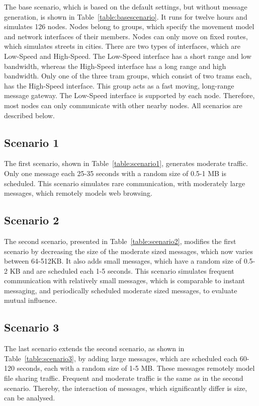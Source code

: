 \documentclass[conference,10pt,letterpaper,final]{IEEEtran}
\begin{document}
The base scenario, which is based on the default settings, but without message generation, is shown in Table~\ref{table:basescenario}.
It runs for twelve hours and simulates 126 nodes.
Nodes belong to groups, which specify the movement model and network interfaces of their members.
Nodes can only move on fixed routes, which simulates streets in cities.
There are two types of interfaces, which are Low-Speed and High-Speed.
The Low-Speed interface has a short range and low bandwidth, whereas the High-Speed interface has a long range and high bandwidth.
Only one of the three tram groups, which consist of two trams each, has the High-Speed interface.
This group acts as a fast moving, long-range message gateway.
The Low-Speed interface is supported by each node.
Therefore, most nodes can only communicate with other nearby nodes.
All scenarios are described below.
\vspace{0.4cm}

\subsection{Scenario 1}
\label{subsec:scenario1}
The first scenario, shown in Table~\ref{table:scenario1}, generates moderate traffic. Only one message each 25-35 seconds with a random size of 0.5-1 MB is scheduled.
This scenario simulates rare communication, with moderately large messages, which remotely models web browsing.
\vspace{0.2cm}

\subsection{Scenario 2}
\label{subsec:scenario2}
The second scenario, presented in Table~\ref{table:scenario2}, modifies the first scenario by decreasing the size of the moderate sized messages, which now varies between 64-512KB.
It also adds small messages, which have a random size of 0.5-2 KB and are scheduled each 1-5 seconds.
This scenario simulates frequent communication with relatively small messages, which is comparable to instant messaging, and periodically scheduled moderate sized messages, to evaluate mutual influence.
\vspace{0.2cm}

\subsection{Scenario 3}
\label{subsec:scenario3}
The last scenario extends the second scenario, as shown in Table~\ref{table:scenario3}, by adding large messages, which are scheduled each 60-120 seconds, each with a random size of 1-5 MB.
These messages remotely model file sharing traffic.
Frequent and moderate traffic is the same as in the second scenario.
Thereby, the interaction of messages, which significantly differ is size, can be analysed.
\vspace{0.2cm}
\end{document}

